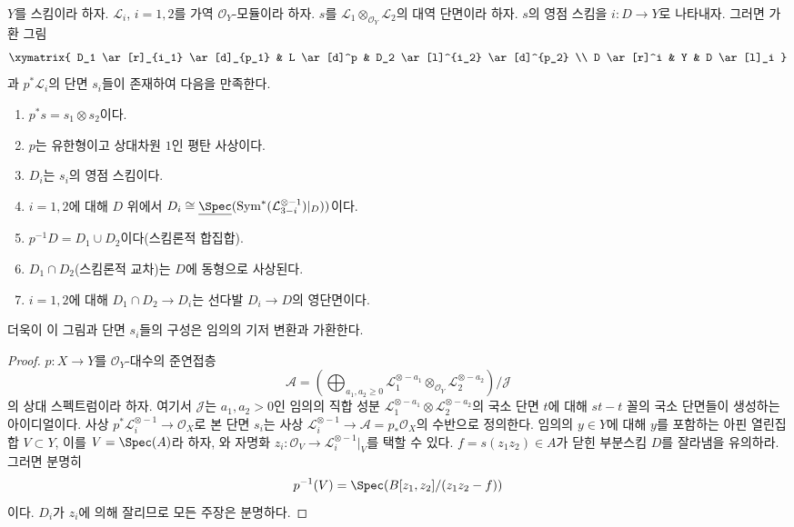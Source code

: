\begin{lemma}
\label{lemma-decompose-section}
$Y$를 스킴이라 하자. $\mathcal{L}_i$, $i = 1, 2$를 가역
$\mathcal{O}_Y$-모듈이라 하자. $s$를
$\mathcal{L}_1 \otimes_{\mathcal{O}_Y} \mathcal{L}_2$의 대역 단면이라 하자.
$s$의 영점 스킴을 $i : D \to Y$로 나타내자. 그러면 가환 그림
$$
\xymatrix{
D_1 \ar[r]_{i_1} \ar[d]_{p_1} &
L \ar[d]^p &
D_2 \ar[l]^{i_2} \ar[d]^{p_2} \\
D \ar[r]^i &
Y &
D \ar[l]_i
}
$$
과 $p^*\mathcal{L}_i$의 단면 $s_i$들이 존재하여 다음을 만족한다.
\begin{enumerate}
\item $p^*s = s_1 \otimes s_2$이다.
\item $p$는 유한형이고 상대차원 $1$인 평탄 사상이다.
\item $D_i$는 $s_i$의 영점 스킴이다.
\item $i = 1, 2$에 대해 $D$ 위에서
$D_i \cong
\underline{\Spec}(\text{Sym}^*(\mathcal{L}_{3 - i}^{\otimes -1})|_D))$이다.
\item $p^{-1}D = D_1 \cup D_2$이다(스킴론적 합집합).
\item $D_1 \cap D_2$(스킴론적 교차)는 $D$에 동형으로 사상된다.
\item $i = 1, 2$에 대해 $D_1 \cap D_2 \to D_i$는 선다발
$D_i \to D$의 영단면이다.
\end{enumerate}
더욱이 이 그림과 단면 $s_i$들의 구성은 임의의 기저 변환과 가환한다.
\end{lemma}

\begin{proof}
$p : X \to Y$를 $\mathcal{O}_Y$-대수의 준연접층
$$
\mathcal{A} =
\left(\bigoplus\nolimits_{a_1, a_2 \geq 0}
\mathcal{L}_1^{\otimes -a_1} \otimes_{\mathcal{O}_Y}
\mathcal{L}_2^{\otimes -a_2}\right)/\mathcal{J}
$$
의 상대 스펙트럼이라 하자. 여기서 $\mathcal{J}$는 $a_1, a_2 > 0$인
임의의 직합 성분
$\mathcal{L}_1^{\otimes -a_1} \otimes \mathcal{L}_2^{\otimes -a_2}$의
국소 단면 $t$에 대해 $st - t$ 꼴의 국소 단면들이 생성하는
아이디얼이다. 사상 $p^*\mathcal{L}_i^{\otimes -1} \to \mathcal{O}_X$로
본 단면 $s_i$는 사상
$\mathcal{L}_i^{\otimes -1} \to \mathcal{A} = p_*\mathcal{O}_X$의
수반으로 정의한다. 임의의 $y \in Y$에 대해 $y$를 포함하는 아핀
열린집합 $V \subset Y$, 이를 $V = \Spec(A)$라 하자, 와 자명화
$z_i : \mathcal{O}_V \to \mathcal{L}_i^{\otimes -1}|_V$를 택할 수 있다.
$f = s(z_1z_2) \in A$가 닫힌 부분스킴 $D$를 잘라냄을 유의하라. 그러면
분명히
$$
p^{-1}(V) = \Spec(B[z_1, z_2]/(z_1 z_2 - f))
$$
이다. $D_i$가 $z_i$에 의해 잘리므로 모든 주장은 분명하다.
\end{proof}

